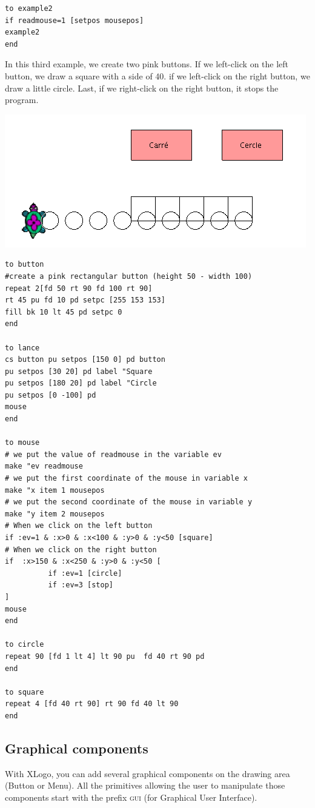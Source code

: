 \begin{verbatim}
to example2
if readmouse=1 [setpos mousepos]
example2
end
\end{verbatim}
In this third example, we create two pink buttons. If we left-click on the left button, we draw a square with a side of 40. if we left-click on the right button, we draw a little circle. Last, if we right-click on the right button, it stops the program.

\includegraphics*[width=15 cm]{pics/lissouris.png}
\begin{verbatim}
to button
#create a pink rectangular button (height 50 - width 100) 
repeat 2[fd 50 rt 90 fd 100 rt 90] 
rt 45 pu fd 10 pd setpc [255 153 153]
fill bk 10 lt 45 pd setpc 0
end

to lance
cs button pu setpos [150 0] pd button
pu setpos [30 20] pd label "Square
pu setpos [180 20] pd label "Circle
pu setpos [0 -100] pd
mouse
end

to mouse
# we put the value of readmouse in the variable ev
make "ev readmouse
# we put the first coordinate of the mouse in variable x
make "x item 1 mousepos
# we put the second coordinate of the mouse in variable y
make "y item 2 mousepos
# When we click on the left button
if :ev=1 & :x>0 & :x<100 & :y>0 & :y<50 [square]
# When we click on the right button
if  :x>150 & :x<250 & :y>0 & :y<50 [
          if :ev=1 [circle]
          if :ev=3 [stop]
]
mouse
end

to circle
repeat 90 [fd 1 lt 4] lt 90 pu  fd 40 rt 90 pd
end

to square
repeat 4 [fd 40 rt 90] rt 90 fd 40 lt 90
end
\end{verbatim} 
\subsection{Graphical components}
With XLogo, you can add several graphical components on the drawing area (Button or Menu). All the primitives allowing the user to manipulate those components start with  the prefix  \textsc{gui} (for Graphical User Interface).

